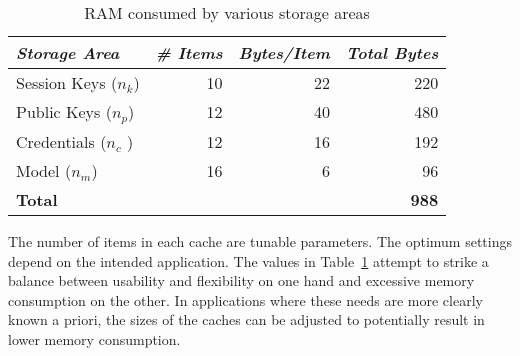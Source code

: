 \begin{table}[!t]
  \newcommand\T{\rule{0pt}{2.1ex}}
  \centering
  \caption{RAM consumed by various storage areas}
  {
  \begin{tabular}{|l|r|r|r|} \hline
    \textit{Storage Area} \T & \textit{\# Items} & \textit{Bytes/Item} & \textit{Total Bytes} \\
    \hline \hline

    Session Keys ($n_k$) \T & 10 & 22 & 220 \\ \hline 
    Public Keys ($n_p$)  \T & 12 & 40 & 480 \\ \hline
    Credentials ($n_c$ ) \T & 12 & 16 & 192 \\ \hline
    Model ($n_m$)        \T & 16 &  6 &  96 \\ \hline \hline
    \textbf{Total} \T & \multicolumn{3}{r|}{ \textbf{988} } \\ \hline
  \end{tabular}
  }
  \label{table-ram-consumed}
\end{table}

The number of items in each cache are tunable parameters. The optimum
settings depend on the intended application. The values in
Table~\ref{table-ram-consumed} attempt to strike a balance between
usability and flexibility on one hand and excessive memory consumption
on the other. In applications where these needs are more clearly known a
priori, the sizes of the caches can be adjusted to potentially result in
lower memory consumption.


